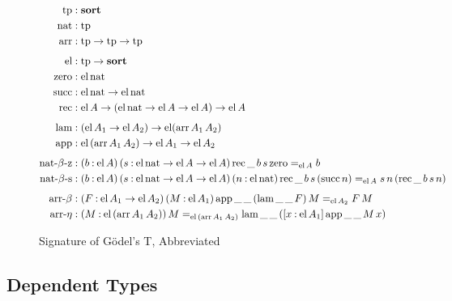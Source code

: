 \documentclass[11pt,twoside]{article}
\newcommand{\parens}[1]{(#1)}
\newcommand{\sortclass}{\ensuremath{\textbf{sort}}}
\newcommand{\eqclass}[3]{{#2}=_{#1}{#3}}
\newcommand{\piclass}[3]{({#2}\mathbin{:}{#1})\,{#3}}
\newcommand{\arrclass}[2]{{#1}\to{#2}}
\newcommand{\lamobj}[3]{[{#2}\mathbin{:}{#1}]\,{#3}}
\newcommand{\appobj}[2]{{#1}\,{#2}}
\begin{document}
\begin{figure}
  
  \begin{align*}
    \tpsort
    & : \sortclass \\
    \nattp
    & : \tpsort \\
    \arrtp
    & : \arrclass{\tpsort}{\arrclass{\tpsort}{\tpsort}} \\[1ex]
    \elfam
%
    & : \arrclass{\tpsort}{\sortclass} \\
    \zerocon
    & : \elof{\nattp} \\
    \succcon
    & : \arrclass {\elof{\nattp}}{\elof{\nattp}} \\
    \reccon
    &  :
      \arrclass{\elof{A}}{
      \arrclass{\parens{\arrclass{\elof{\nattp}}{\arrclass{\elof{A}}{\elof{A}}}}}{
      \elof{A}}} \\[1ex] 
%
    \lamcon
    & :
      \arrclass{\parens{\arrclass{\elof{A_{1}}}{\elof{A_{2}}}}}{
      \elfam{\parens{\arrof{A_{1}}{A_{2}}}}} \\
    \appcon
    & :
      \arrclass{\elof{\parens{\arrof{A_{1}}{A_{2}}}}}{
      \arrclass{\elof{A_{1}}}{\elof{A_{2}}}} \\[1ex]
%
    \reczcon
    & :
      \piclass{\elof{A}}{b}{
      \piclass{\arrclass{\elof{\nattp}}{\arrclass{\elof{A}}{\elof{A}}}}{s}{
      \eqclass{\elof{A}}{\recof{\_{}}{b}{s}{\zerocon}}{b}}} \\
    \recscon
    & :
      \piclass{\elof{A}}{b}{
      \piclass{\arrclass{\elof{\nattp}}{\arrclass{\elof{A}}{\elof{A}}}}{s}{
      \piclass{\elof{\nattp}}{n}{
      \eqclass{\elof{A}}
      {\recof{\_{}}{b}{s}{\parens{\succof{n}}}}{\appobj{\appobj{s}{n}}{\parens{\recof{\_{}}{b}{s}{n}}}}}}} \\[1ex]
%
    \betacon
    & :
      \piclass{\arrclass{\elof{A_{1}}}{\elof{A_{2}}}}{F}{
      \piclass{\elof{A_{1}}}{M}{
      \eqclass{\elof{A_{2}}}
      {\appof{\_{}}{\_{}}{\parens{\lamof{\_{}}{\_{}}{F}}}{M}}
      {\appobj{F}{M}}}} \\
    \etacon
    & :
      \piclass{\elof{\parens{\arrof{A_{1}}{A_{2}}}}}{M}{
      \eqclass{\elof{\parens{\arrof{A_{1}}{A_{2}}}}}
      {M}
      {\lamof{\_{}}{\_{}}{\parens{\lamobj{\elof{A_{1}}}{x}{\appof{\_{}}{\_{}}{M}{x}}}}}}
  \end{align*}

  \caption{Signature of G\"odel's T, Abbreviated}
  \label{fig:t-sig-abbr}
\end{figure}

\subsection{Dependent Types}



\end{document}
